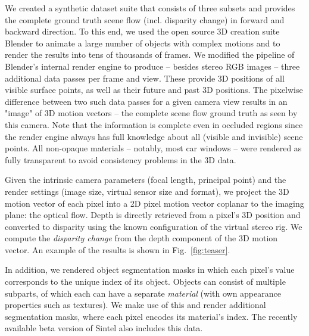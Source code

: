 \documentclass[10pt,twocolumn,letterpaper]{article}
\begin{document}
\label{sec:our_datasets}

We created a synthetic dataset suite that consists of three subsets and provides the complete ground truth scene flow (incl. disparity change) in forward and backward direction.  
To this end, we used the open source 3D creation suite Blender to animate a large number of objects with complex motions and to render the results into tens of thousands of frames.
We modified the pipeline of Blender's internal render engine to produce -- besides stereo RGB images -- three additional data passes per frame and view. 
These provide 3D positions of all visible surface points, as well as their future and past 3D positions. The pixelwise difference between two such data passes for a given camera view results in an "image" of 3D motion vectors -- the complete scene flow ground truth as seen by this camera. 
Note that the information is complete even in occluded regions since the render engine always has full knowledge about all (visible and invisible) scene points.
All non-opaque materials -- notably, most car windows -- were rendered as fully transparent to avoid consistency problems in the 3D data.

Given the intrinsic camera parameters (focal length, principal point) and the render settings (image size, virtual sensor size and format), we project the 3D motion vector of each pixel into a 2D pixel motion vector coplanar to the imaging plane: 
the optical flow. 
Depth is directly retrieved from a pixel's 3D position and converted to disparity using the known configuration of the virtual stereo rig.
We compute the \emph{disparity change} from the depth component of the 3D motion vector.
An example of the results is shown in Fig.~\ref{fig:teaser}.

In addition, we rendered object segmentation masks in which each pixel's value corresponds to the unique index of its object. 
Objects can consist of multiple subparts, of which each can have a separate \emph{material} (with own appearance properties such as textures). We make use of this and render additional segmentation masks, where each pixel encodes its material's index.
The recently available beta version of Sintel also includes this data.

\end{document}
